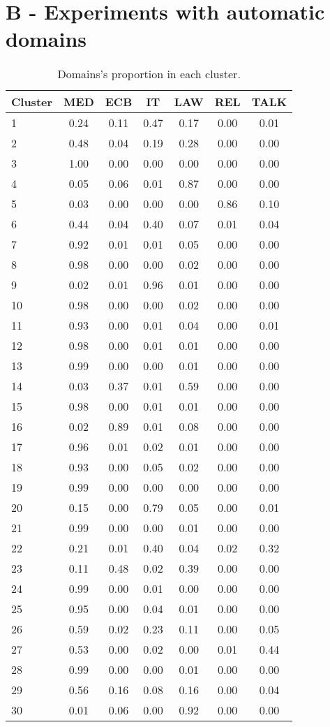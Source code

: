 \documentclass[11pt]{article}
\begin{document}
\section*{B - Experiments with automatic domains}
\begin{table*}[htbp]
  \centering
  \footnotesize
  \begin{tabular}{|p{1.3cm}|*{6}{c|}} \hline
Cluster&MED&ECB&IT&LAW&REL&TALK \\
\hline
1&0.24&0.11&0.47&0.17&0.00&0.01 \\
2&0.48&0.04&0.19&0.28&0.00&0.00 \\
3&1.00&0.00&0.00&0.00&0.00&0.00 \\
4&0.05&0.06&0.01&0.87&0.00&0.00 \\
5&0.03&0.00&0.00&0.00&0.86&0.10 \\
6&0.44&0.04&0.40&0.07&0.01&0.04 \\
7&0.92&0.01&0.01&0.05&0.00&0.00 \\
8&0.98&0.00&0.00&0.02&0.00&0.00 \\
9&0.02&0.01&0.96&0.01&0.00&0.00 \\
10&0.98&0.00&0.00&0.02&0.00&0.00 \\
11&0.93&0.00&0.01&0.04&0.00&0.01 \\
12&0.98&0.00&0.01&0.01&0.00&0.00 \\
13&0.99&0.00&0.00&0.01&0.00&0.00 \\
14&0.03&0.37&0.01&0.59&0.00&0.00 \\
15&0.98&0.00&0.01&0.01&0.00&0.00 \\
16&0.02&0.89&0.01&0.08&0.00&0.00 \\
17&0.96&0.01&0.02&0.01&0.00&0.00 \\
18&0.93&0.00&0.05&0.02&0.00&0.00 \\
19&0.99&0.00&0.00&0.00&0.00&0.00 \\
20&0.15&0.00&0.79&0.05&0.00&0.01 \\
21&0.99&0.00&0.00&0.01&0.00&0.00 \\
22&0.21&0.01&0.40&0.04&0.02&0.32 \\
23&0.11&0.48&0.02&0.39&0.00&0.00 \\
24&0.99&0.00&0.01&0.00&0.00&0.00 \\
25&0.95&0.00&0.04&0.01&0.00&0.00 \\
26&0.59&0.02&0.23&0.11&0.00&0.05 \\
27&0.53&0.00&0.02&0.00&0.01&0.44 \\
28&0.99&0.00&0.00&0.01&0.00&0.00 \\
29&0.56&0.16&0.08&0.16&0.00&0.04 \\
30&0.01&0.06&0.00&0.92&0.00&0.00 \\
\hline
\end{tabular}
\caption{Domains's proportion in each cluster.}
\label{tab:automatic_domains}
\end{table*}
\end{document}

